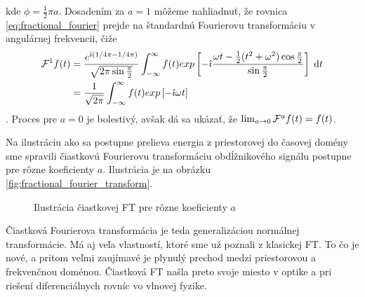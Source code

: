 kde $\phi = \frac{1}{2} \pi a$.
Dosadením za $a=1$ môžeme nahliadnuť, že rovnica
\ref{eq:fractional_fourier} prejde na štandardnú Fourierovu
transformáciu v angulárnej frekvencii, čiže
\begin{equation}
    \begin{split}
    \mathcal{F}^1 f(t) &=
        \frac{e^{\hat{\imath}( 1/4 \pi - 1/4 \pi)}}{\sqrt{2 \pi \sin \frac{\pi}{2}} }
        \int_{-\infty}^{\infty} f(t) exp\left[ 
            -\hat{\imath} \frac{\omega t - \frac{1}{2}( t^2 + \omega^2)
            \cos\frac{\pi}{2} }{\sin \frac{\pi}{2}}
        \right] \; \mathrm{d} t \\
        &= \frac{1}{\sqrt{2 \pi}} 
            \int_{-\infty}^{\infty} f(t) exp\left[ -\hat{\imath} \omega t\right]
        \end{split}
\end{equation}
. Proces pre $a=0$ je bolestivý, avšak dá sa ukázať, že
$\lim_{a\rightarrow0} \mathcal{F}^a f(t) = f(t)$.

Na ilustráciu ako sa postupne prelieva energia z priestorovej do
časovej domény sme spravili čiastkovú Fourierovu transformáciu
obdĺžnikového signálu postupne pre rôzne koeficienty $a$. Ilustrácia
je na obrázku \ref{fig:fractional_fourier_transform}.

\begin{figure}[htp]
    \def\imagepath{obrazky/transformacia/fractional_fourier_transform}
    \centering
    \label{fig:fractional_foruier_transform}
    \caption{Ilustrácia čiastkovej FT pre rôzne koeficienty $a$}
\end{figure}

Čiastková Fourierova transformácia je teda generalizáciou normálnej
transformácie. Má aj veľa vlastností, ktoré sme už poznali z klasickej
FT. To čo je nové, a pritom veľmi zaujímavé je plynulý prechod medzi
priestorovou a frekvenčnou doménou. Čiastková FT našla preto svoje
miesto v optike a pri riešení diferenciálnych
rovníc vo vlnovej fyzike.

